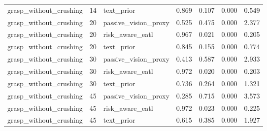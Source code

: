 \begin{tabular}{lllrrrr}
grasp\_without\_crushing & 14 & text\_prior & 0.869 & 0.107 & 0.000 & 0.549 \\
grasp\_without\_crushing & 20 & passive\_vision\_proxy & 0.525 & 0.475 & 0.000 & 2.377 \\
grasp\_without\_crushing & 20 & risk\_aware\_eatl & 0.967 & 0.021 & 0.000 & 0.205 \\
grasp\_without\_crushing & 20 & text\_prior & 0.845 & 0.155 & 0.000 & 0.774 \\
grasp\_without\_crushing & 30 & passive\_vision\_proxy & 0.413 & 0.587 & 0.000 & 2.933 \\
grasp\_without\_crushing & 30 & risk\_aware\_eatl & 0.972 & 0.020 & 0.000 & 0.203 \\
grasp\_without\_crushing & 30 & text\_prior & 0.736 & 0.264 & 0.000 & 1.321 \\
grasp\_without\_crushing & 45 & passive\_vision\_proxy & 0.285 & 0.715 & 0.000 & 3.573 \\
grasp\_without\_crushing & 45 & risk\_aware\_eatl & 0.972 & 0.023 & 0.000 & 0.225 \\
grasp\_without\_crushing & 45 & text\_prior & 0.615 & 0.385 & 0.000 & 1.927 \\
\bottomrule
\end{tabular}
